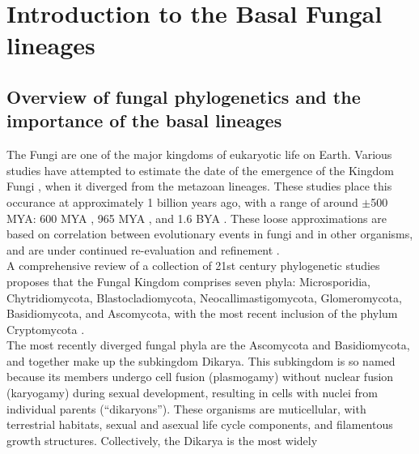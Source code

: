 \chapter{Introduction to the Basal Fungal lineages}
\section{Overview of fungal phylogenetics and the importance of the basal lineages}
The Fungi are one of the major kingdoms of eukaryotic life on
Earth. Various studies have attempted to estimate the date of the
emergence of the Kingdom Fungi \cite{Taylor2006}, when it diverged
from the metazoan lineages. These studies place this occurance at
approximately 1 billion years ago, with a range of around $\pm$500
MYA: 600 MYA \cite{Berbee1993}, 965 MYA \cite{Doolittle1996}, and 1.6
BYA \cite{Wang1999}. These loose approximations are based on
correlation between evolutionary events in fungi and in other
organisms, and are under continued re-evaluation and refinement
\cite{Berbee2010}.\\
\indent A comprehensive review of a collection of 21st century
phylogenetic studies \cite{Hibbett2007} proposes that the Fungal
Kingdom comprises seven phyla: Microsporidia, Chytridiomycota,
Blastocladiomycota, Neocallimastigomycota, Glomeromycota,
Basidiomycota, and Ascomycota, with the most recent inclusion of the
phylum Cryptomycota \cite{Jones2011}.\\
\indent The most recently diverged fungal phyla are the Ascomycota and
Basidiomycota, and together make up the subkingdom Dikarya. This
subkingdom is so named because its members undergo cell fusion
(plasmogamy) without nuclear fusion (karyogamy) during sexual
development, resulting in cells with nuclei from individual parents
(\enquote{dikaryons}). These organisms are muticellular, with terrestrial
habitats, sexual and asexual life cycle components, and filamentous
growth structures. Collectively, the Dikarya is the most widely
